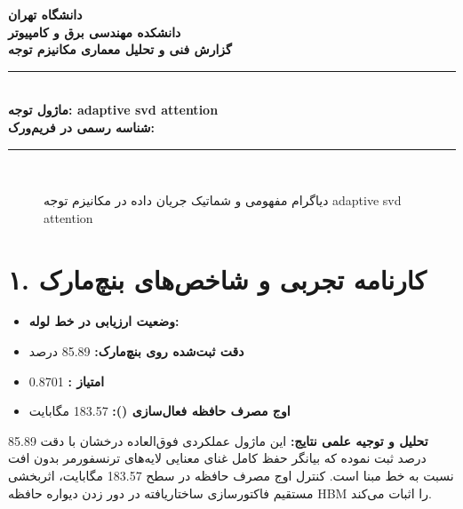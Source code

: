 \documentclass[12pt,a4paper]{article}
\begin{document}
\begin{center}
{\Large\bfseries دانشگاه تهران}\\[0.2cm]
{\large\bfseries دانشکده مهندسی برق و کامپیوتر}\\[0.2cm]
{\large\bfseries گزارش فنی و تحلیل معماری مکانیزم توجه}\\[0.5cm]
\rule{\linewidth}{1pt}\\[0.3cm]
{\LARGE\bfseries ماژول توجه: adaptive svd attention}\\[0.2cm]
{\large \textbf{شناسه رسمی در فریم‌ورک:} }\\[0.2cm]
\rule{\linewidth}{1pt}\\[0.5cm]
\end{center}

\begin{figure}[H]
\centering
{}
\caption{دیاگرام مفهومی و شماتیک جریان داده در مکانیزم توجه adaptive svd attention}
\end{figure}

\section*{۱. کارنامه تجربی و شاخص‌های بنچ‌مارک}
\begin{itemize}
\item \textbf{وضعیت ارزیابی در خط لوله:} 
\item \textbf{دقت ثبت‌شده روی بنچ‌مارک:} 85.89 درصد
\item \textbf{امتیاز :} 0.8701
\item \textbf{اوج مصرف حافظه فعال‌سازی ():} 183.57 مگابایت
\end{itemize}
\textbf{تحلیل و توجیه علمی نتایج:} این ماژول عملکردی فوق‌العاده درخشان با دقت 85.89 درصد ثبت نموده که بیانگر حفظ کامل غنای معنایی لایه‌های ترنسفورمر بدون افت نسبت به خط مبنا است. کنترل اوج مصرف حافظه در سطح 183.57 مگابایت، اثربخشی مستقیم فاکتورسازی ساختاریافته در دور زدن دیواره حافظه HBM را اثبات می‌کند.
\end{document}
